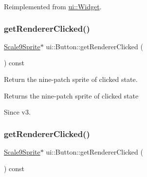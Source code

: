 Reimplemented from \hyperlink{classui_1_1Widget_ad85abdaa9133dc6b8efc32670ae9b93f}{ui\+::\+Widget}.

\mbox{\label{classui_1_1Button_a523675e1698203d0fd683307e6458bc2}} 
\subsubsection{\texorpdfstring{get\+Renderer\+Clicked()}{getRendererClicked()}\hspace{0.1cm}{\footnotesize\ttfamily [1/2]}}
{\footnotesize\ttfamily \hyperlink{classui_1_1Scale9Sprite}{Scale9\+Sprite}$\ast$ ui\+::\+Button\+::get\+Renderer\+Clicked (\begin{DoxyParamCaption}{ }\end{DoxyParamCaption}) const\hspace{0.3cm}{\ttfamily [inline]}}



Return the nine-\/patch sprite of clicked state. 

\begin{DoxyReturn}{Returns}
the nine-\/patch sprite of clicked state 
\end{DoxyReturn}
\begin{DoxySince}{Since}
v3. 
\end{DoxySince}
\mbox{\label{classui_1_1Button_a523675e1698203d0fd683307e6458bc2}} 
\subsubsection{\texorpdfstring{get\+Renderer\+Clicked()}{getRendererClicked()}\hspace{0.1cm}{\footnotesize\ttfamily [2/2]}}
{\footnotesize\ttfamily \hyperlink{classui_1_1Scale9Sprite}{Scale9\+Sprite}$\ast$ ui\+::\+Button\+::get\+Renderer\+Clicked (\begin{DoxyParamCaption}{ }\end{DoxyParamCaption}) const\hspace{0.3cm}{\ttfamily [inline]}}



